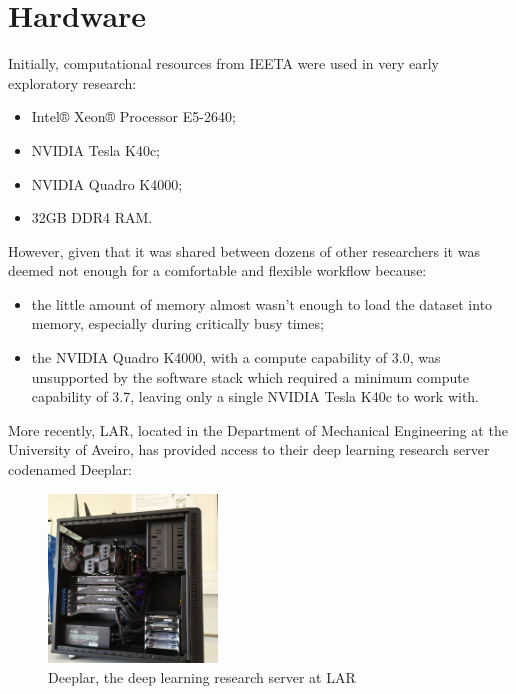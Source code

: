 \section{Hardware}

Initially, computational resources from \ac{IEETA} were used in very early exploratory research:

\begin{itemize}
    \item Intel® Xeon® Processor E5-2640;
    \item NVIDIA Tesla K40c;
    \item NVIDIA Quadro K4000;
    \item 32GB DDR4 RAM.
\end{itemize}

However, given that it was shared between dozens of other researchers it was deemed not enough for a comfortable and flexible workflow because:

\begin{itemize}
    \item the little amount of memory almost wasn't enough to load the dataset into memory, especially during critically busy times;
    \item the NVIDIA Quadro K4000, with a compute capability of 3.0, was unsupported by the software stack which required a minimum compute capability of 3.7, leaving only a single NVIDIA Tesla K40c to work with.
\end{itemize}

More recently, \ac{LAR}, located in the Department of Mechanical Engineering at the University of Aveiro, has provided access to their deep learning research server codenamed Deeplar:

\begin{figure}[ht]
    \centering
    \includegraphics[width=0.4\textwidth]{figs/deeplar.jpg}
    \caption{Deeplar, the deep learning research server at \ac{LAR}}
    \label{fig:deeplar}
\end{figure}


